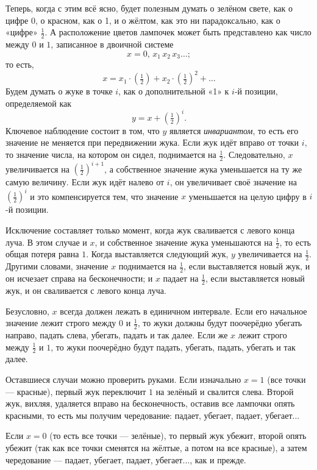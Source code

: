 Теперь, когда с этим всё ясно, будет полезным думать о зелёном свете, как о цифре 0, о красном, как о 1, и о жёлтом, как это ни парадоксально, как о «цифре» $\tfrac12$.
А расположение цветов лампочек может быть представлено как число между $0$ и $1$, записанное в двоичной системе
\[x = 0{,}\,x_1\,x_2\,x_3\dots;\]
то есть,
 \[x = x_1\cdot(\tfrac12)+x_2\cdot(\tfrac12)^2+\dots\]
Будем думать о жуке в точке $i$, как о дополнительной «1» к $i$-й позиции, определяемой как
\[y=x+(\tfrac12)^i.\]
Ключевое наблюдение состоит в том, что $y$ является \emph{инвариантом}, то есть его значение не меняется при передвижении жука.
Если жук идёт вправо от точки $i$, то значение числа, на котором он сидел, поднимается на $\tfrac12$.
Следовательно, $x$ увеличивается на $(\tfrac12)^{i+1}$, а собственное значение жука уменьшается на ту же самую величину.
Если жук идёт налево от $i$, он увеличивает своё значение на $(\tfrac12)^i$ и это компенсируется тем, что значение $x$ уменьшается на целую цифру в $i$-й позиции.

Исключение составляет только момент, когда жук сваливается с левого конца луча.
В этом случае и $x$, и собственное значение жука уменьшаются на $\tfrac12$, то есть общая потеря равна $1$.
Когда выставляется следующий жук, $y$ увеличивается на $\tfrac12$.
Другими словами, значение $x$ поднимается на $\tfrac12$, если выставляется новый жук, и он исчезает справа на бесконечности; и $x$ падает на $\tfrac12$, если выставляется новый жук, и он сваливается с левого конца луча.

Безусловно, $x$ всегда должен лежать в единичном интервале.
Если его начальное значение лежит строго между $0$ и $\tfrac12$, то жуки должны будут поочерёдно убегать направо, падать слева, убегать, падать и так далее.
Если же $x$ лежит строго между $\tfrac12$ и $1$, то жуки поочерёдно будут падать, убегать, падать, убегать и так далее.

Оставшиеся случаи можно проверить руками.
Если изначально $x = 1$ (все точки --- красные), первый жук переключит $1$ на зелёный и свалится слева.
Второй жук, вихляя, удаляется вправо на бесконечность, оставив все лампочки опять красными, то есть мы получим чередование: падает, убегает, падает, убегает...

Если $x = 0$ (то есть все точки --- зелёные), то первый жук убежит, второй опять убежит (так как все точки сменятся на жёлтые, а потом на все красные), а затем чередование --- падает, убегает, падает, убегает..., как и прежде.

